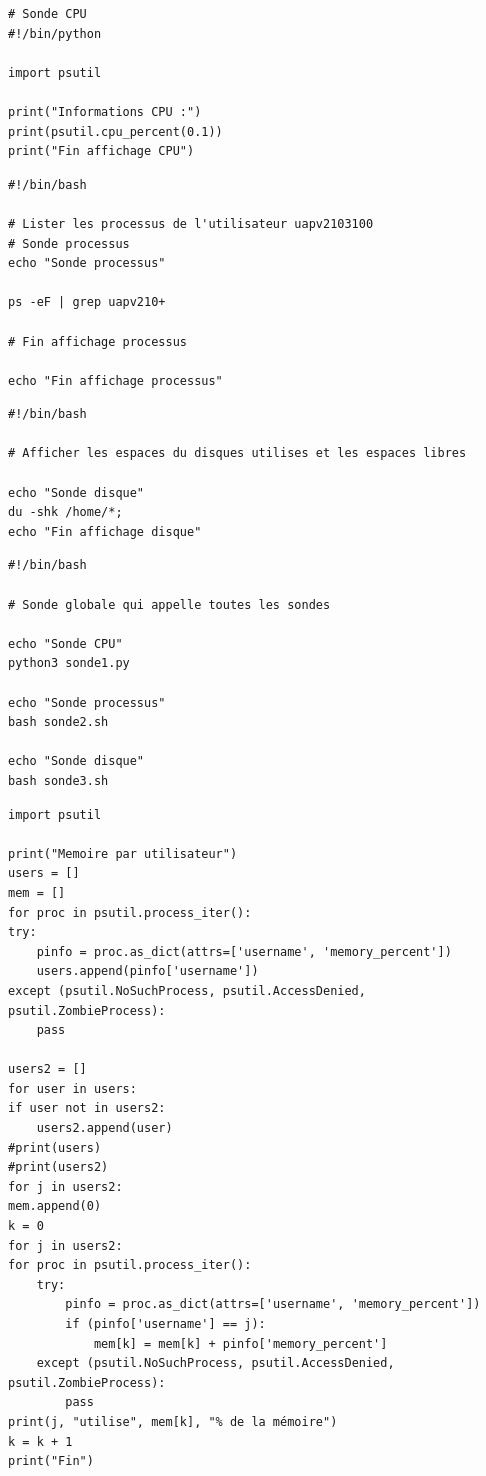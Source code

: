 \documentclass[a4paper, twoside]{report}
\begin{document}
\begin{lstlisting}[style=python]
# Sonde CPU
#!/bin/python

import psutil

print("Informations CPU :")
print(psutil.cpu_percent(0.1))
print("Fin affichage CPU")
\end{lstlisting}



\begin{lstlisting}[style=bash]
#!/bin/bash

# Lister les processus de l'utilisateur uapv2103100
# Sonde processus
echo "Sonde processus"

ps -eF | grep uapv210+

# Fin affichage processus

echo "Fin affichage processus"

\end{lstlisting}


\begin{lstlisting}[style=bash]
#!/bin/bash

# Afficher les espaces du disques utilises et les espaces libres

echo "Sonde disque"
du -shk /home/*;
echo "Fin affichage disque"

\end{lstlisting}


\newpage
\begin{lstlisting}[style=bash]
#!/bin/bash

# Sonde globale qui appelle toutes les sondes

echo "Sonde CPU"
python3 sonde1.py

echo "Sonde processus"
bash sonde2.sh

echo "Sonde disque"
bash sonde3.sh

\end{lstlisting}

\begin{lstlisting}[style=python]
import psutil

print("Memoire par utilisateur")
users = []
mem = []
for proc in psutil.process_iter():
try:
    pinfo = proc.as_dict(attrs=['username', 'memory_percent'])
    users.append(pinfo['username'])
except (psutil.NoSuchProcess, psutil.AccessDenied, psutil.ZombieProcess):
    pass

users2 = []
for user in users:
if user not in users2:
    users2.append(user)
#print(users)
#print(users2)
for j in users2:
mem.append(0)
k = 0
for j in users2:
for proc in psutil.process_iter():
    try:
        pinfo = proc.as_dict(attrs=['username', 'memory_percent'])
        if (pinfo['username'] == j):
            mem[k] = mem[k] + pinfo['memory_percent']
    except (psutil.NoSuchProcess, psutil.AccessDenied, psutil.ZombieProcess):
        pass
print(j, "utilise", mem[k], "% de la mémoire")
k = k + 1
print("Fin")

\end{lstlisting}
\end{document}
